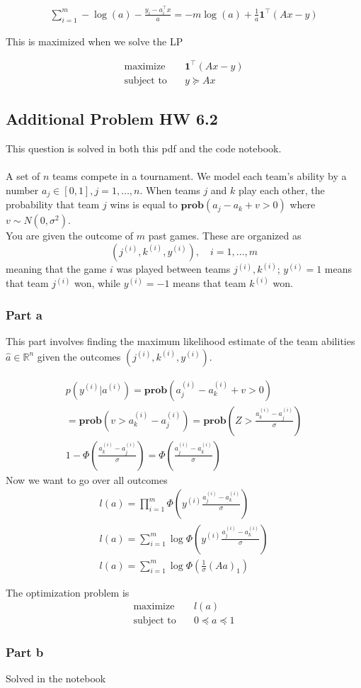 \begin{gather}
    \sum_{i=1}^m -\log (a) -\frac{y_i - a_i^\top x}{a} = -m \log(a) + \frac{1}{a}\textbf{1}^\top(Ax -y) 
\end{gather}

This is maximized when we solve the LP

\begin{align}
  \text{maximize} & \quad \textbf{1}^\top (Ax-y) \\
  \text{subject to} & \quad y \succeq Ax
\end{align}

\subsection{Additional Problem HW 6.2}
This question is solved in both this pdf and the code notebook.
\\ \\
A set of $n$ teams compete in a tournament. We model each team's ability by a number $a_j \in [0,1], j = 1, \dots, n$. When teams $j$ and $k$ play each other, the probability that team $j$ wins is equal to $\textbf{prob}(a_j - a_k + v > 0)$ where $v \sim N(0, \sigma^2)$. \\
You are given the outcome of $m$ past games. These are organized as
\begin{equation}
    (j^{(i)}, k^{(i)}, y^{(i)}), \quad i = 1, \dots, m
\end{equation}
meaning that the game $i$ was played between teams $j^{(i)}, k^{(i)}$; $y^{(i)}=1$ means that team $j^{(i)}$ won, while $y^{(i)}=-1$ means that team $k^{(i)}$ won.
\subsubsection{Part a}
This part involves finding the maximum likelihood estimate of the team abilities $\hat{a} \in \mathbb{R}^n$ given the outcomes  $(j^{(i)}, k^{(i)}, y^{(i)})$.

\begin{gather}
    p(y^{(i)} | a^{(i)}) = \textbf{prob} (a_j^{(i)} - a_k^{(i)} + v > 0) \\
    = \textbf{prob} (v > a_k^{(i)} - a_j^{(i)}) =  \textbf{prob} (Z > \frac{a_k^{(i)} - a_j^{(i)}}{\sigma}) \\
    1 - \Phi (\frac{a_k^{(i)} - a_j^{(i)}}{\sigma}) = \Phi (\frac{a_j^{(i)} - a_k^{(i)}}{\sigma})
\end{gather}
Now we  want to go over all outcomes
\begin{gather}
    l(a) = \prod_{i=1}^{m} \Phi (y^{(i)}\frac{a_j^{(i)} - a_k^{(i)}}{\sigma}) \\
    l(a) = \sum_{i=1}^{m} \log \Phi (y^{(i)}\frac{a_j^{(i)} - a_k^{(i)}}{\sigma}) \\
    l(a) = \sum_{i=1}^{m} \log \Phi (\frac{1}{\sigma} (Aa)_1)
\end{gather}

The optimization problem is
\begin{align}
  \text{maximize} & \quad l(a) \\
  \text{subject to} & \quad  0 \preceq a \preceq 1
\end{align}

\subsubsection{Part b}
Solved in the notebook